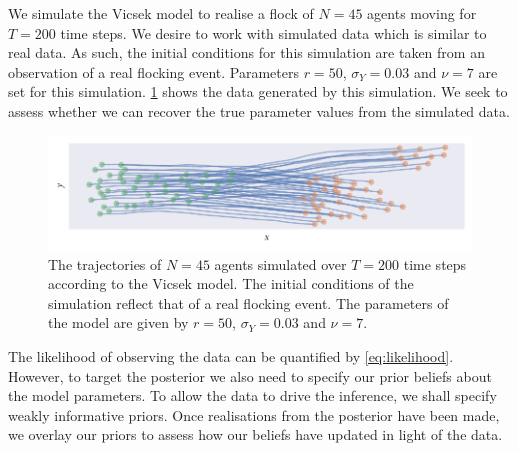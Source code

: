 We simulate the Vicsek model to realise a flock of $N=45$ agents moving for $T=200$ time
steps. We desire to work with simulated data which is similar to real data. As such, the
initial conditions for this simulation are taken from an observation of a real flocking
event. Parameters $r=50$, $\sigma_Y=0.03$ and $\nu=7$ are set for this simulation.
\cref{fig:vicsek_sim_study} shows the data generated by this simulation. We seek to assess
whether we can recover the true parameter values from the simulated data.

\begin{figure}[tb]
    \includegraphics{vicsek_sim.pdf}
    \caption{The trajectories of $N=45$ agents simulated over $T=200$ time steps according to
    the Vicsek model. The initial conditions of the simulation reflect that of a real
flocking event. The parameters of the model are given by $r=50$, $\sigma_Y=0.03$ and
$\nu=7$.}
    \label{fig:vicsek_sim_study}
\end{figure}

The likelihood of observing the data can be quantified by \cref{eq:likelihood}. However,
to target the posterior we also need to specify our prior beliefs about the model
parameters. To allow the data to drive the inference, we shall specify weakly informative
priors. Once realisations from the posterior have been made, we overlay our priors to
assess how our beliefs have updated in light of the data. 

